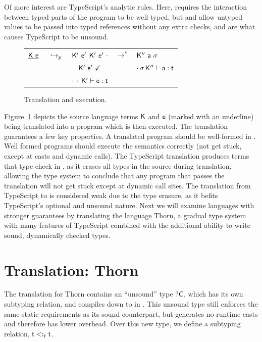 \documentclass[a4paper,USenglish]{tex/lipics-v2016}
\begin{document}
Of more interest are TypeScript's analytic rules. Here, 
requires the interaction between typed parts of the program to be well-typed,
but  and  allow untyped values to be passed
into typed references without any extra checks, and are what causes TypeScript
to be unsound.

\begin{figure}[!h]
\Large
\begin{tabular}{rcccl}
$\underline{{\sf{K}}~{\sf{e}}}$ & $\underline{} ~\hookrightarrow_p~$ & ${{\sf{K'}}}~{{{\sf{e'}}}}$ ${{\sf{K'}}}~{{{\sf{e'}}}}~\cdot$ & $\longrightarrow^*$ & ${{\sf{K''}}}~{\sf{a}}~\sigma$ \\
&& ${{\sf{K'}}}~{{{\sf{e'}}}}~\checkmark$ & & 
$\EnvType {\cdot}{\s}\Kpp\a\t$ \\
& & $\EnvType {\cdot}{\cdot}\Kp\e\t$ && \\ 
\end{tabular}
\caption{\kafka Translation and execution.}\label{redu}
\end{figure}

Figure~\ref{redu} depicts the source language terms ${\sf{K}}$ and ${\sf{e}}$ 
(marked with an underline) being translated into a \kafka program which is then executed.
The translation guarantees a few key properties. A translated program 
should be well-formed in \kafka. Well formed \kafka programs  
should execute the \kafka semantics correctly (not get stuck, except at casts and dynamic calls). 
The TypeScript translation produces terms that type check in \kafka, as it erases
all types in the source during translation, allowing the \kafka type system to
conclude that any program that passes the translation will not get stuck except
at dynamic call sites.
The translation from TypeScript to \kafka is considered weak due to the type erasure, 
as it befits TypeScript's optional and unsound nature. Next we will examine languages
with stronger guarantees by translating the language Thorn, a gradual type system with
many features of TypeScript combined with the additional ability to write sound,
dynamically checked types.

\section{Translation: Thorn}
\newcommand{\bC}{\xt{!C}}

The translation for Thorn contains an ``unsound'' type ${\sf{?}}{\sf{C}}$, which has its own subtyping relation, and compiles 
down to \any in \kafka. This unsound type still enforces the same static requirements as its sound counterpart, but 
generates no runtime casts and therefore has lower overhead. Over this new type, we define a subtyping relation, 
$\t \Sub_t \t$.
\end{document}
